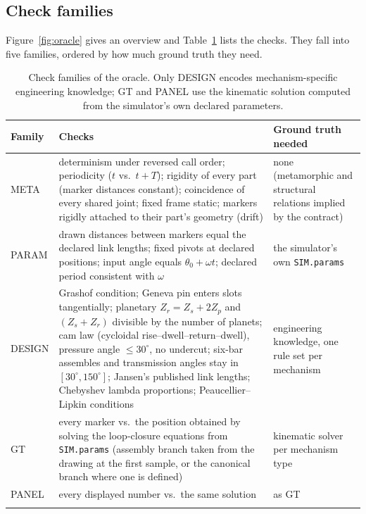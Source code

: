 \subsection{Check families}
Figure~\ref{fig:oracle} gives an overview and Table~\ref{tab:checks} lists the checks. They fall into five families, ordered by how much ground truth they need.



\begin{table}[!htbp]
\caption{Check families of the oracle. Only DESIGN encodes mechanism-specific engineering knowledge; GT and PANEL use the kinematic solution computed from the simulator's own declared parameters.}\label{tab:checks}
\begin{tabular*}{\textwidth}{@{\extracolsep\fill}lp{}p{}}
\toprule
Family & Checks & Ground truth needed \\
\midrule
META & determinism under reversed call order; periodicity ($t$ vs.\ $t+T$); rigidity of every part (marker distances constant); coincidence of every shared joint; fixed frame static; markers rigidly attached to their part's geometry (drift) & none (metamorphic and structural relations implied by the contract) \\
PARAM & drawn distances between markers equal the declared link lengths; fixed pivots at declared positions; input angle equals $\theta_0+\omega t$; declared period consistent with $\omega$ & the simulator's own \texttt{SIM.params} \\
DESIGN & Grashof condition; Geneva pin enters slots tangentially; planetary $Z_r=Z_s+2Z_p$ and $(Z_s+Z_r)$ divisible by the number of planets; cam law (cycloidal rise--dwell--return--dwell), pressure angle $\le 30^\circ$, no undercut; six-bar assembles and transmission angles stay in $[30^\circ,150^\circ]$; Jansen's published link lengths; Chebyshev lambda proportions; Peaucellier--Lipkin conditions & engineering knowledge, one rule set per mechanism \\
GT & every marker vs.\ the position obtained by solving the loop-closure equations from \texttt{SIM.params} (assembly branch taken from the drawing at the first sample, or the canonical branch where one is defined) & kinematic solver per mechanism type \\
PANEL & every displayed number vs.\ the same solution & as GT \\
\botrule
\end{tabular*}
\end{table}

